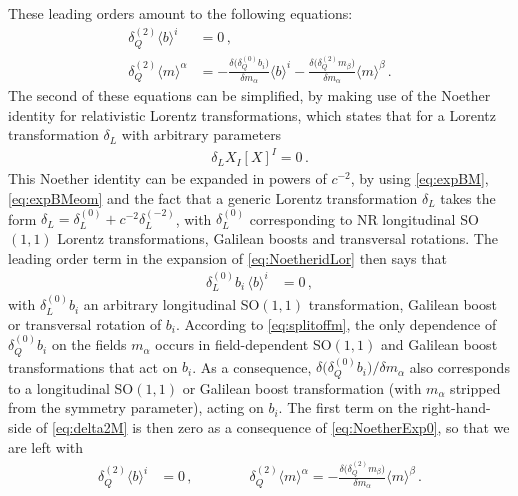 \documentclass[a4paper,10pt,openany]{article}
\begin{document}
	These leading orders amount to the following equations:
	\begin{subequations}
		\begin{align}
			\delta_Q^{(2)}\langle b\rangle^i &= 0\,,\label{eq:delta2B}\\
			\delta_Q^{(2)}\langle m\rangle^\alpha &= -\frac{\delta\big(\delta_Q^{(0)}b_i\big)}{\delta m_\alpha}\langle b \rangle^i - \frac{\delta\big(\delta_Q^{(2)}m_\beta\big)}{\delta m_\alpha}\langle m\rangle^\beta\,. \label{eq:delta2M}
		\end{align}
	\end{subequations}
	The second of these equations can be simplified, by making use of the Noether identity for relativistic Lorentz transformations, which states that for a Lorentz transformation $\delta_L$ with arbitrary parameters
	\begin{align} \label{eq:NoetheridLor}
		\delta_L X_I [X]^I = 0 \,.
	\end{align}
	This Noether identity can be expanded in powers of $c^{-2}$, by using \eqref{eq:expBM}, \eqref{eq:expBMeom} and the fact that a generic Lorentz transformation $\delta_L$ takes the form $\delta_L = \delta_L^{(0)} + c^{-2} \delta_L^{(-2)}$, with $\delta_L^{(0)}$ corresponding to NR longitudinal SO$(1,1)$ Lorentz transformations, Galilean boosts and transversal rotations. The leading order term in the expansion of \eqref{eq:NoetheridLor} then says that
	\begin{align} \label{eq:NoetherExp0}
		\delta^{(0)}_L b_i\,\langle b\rangle^i &= 0\,,
	\end{align}
	with $\delta_L^{(0)} b_i$ an arbitrary longitudinal SO$(1,1)$ transformation, Galilean boost or transversal rotation of $b_i$. According to \eqref{eq:splitoffm}, the only dependence of $\delta_Q^{(0)} b_i$ on the fields $m_\alpha$ occurs in field-dependent SO$(1,1)$ and Galilean boost transformations that act on $b_i$. As a consequence, $\delta\big(\delta_Q^{(0)} b_i\big)/\delta m_\alpha$ also corresponds to a longitudinal SO$(1,1)$ or Galilean boost transformation (with $m_\alpha$ stripped from the symmetry parameter), acting on $b_i$. The first term on the right-hand-side of \eqref{eq:delta2M} is then zero as a consequence of \eqref{eq:NoetherExp0}, so that we are left with
	\begin{align} \label{eq:delta2BMsimpl}
		\delta_Q^{(2)}\langle b\rangle^i &= 0\,, \qquad \qquad
		\delta_Q^{(2)}\langle m\rangle^\alpha = - \frac{\delta\big(\delta_Q^{(2)}m_\beta\big)}{\delta m_\alpha}\langle m\rangle^\beta\,.
	\end{align}
\end{document}
